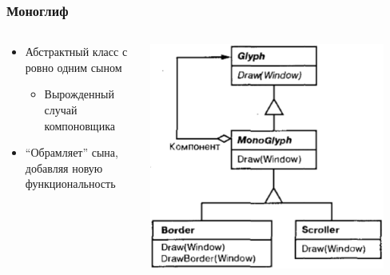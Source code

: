 \documentclass{../cscslides}
\begin{document}
    \begin{frame}
        \frametitle{Моноглиф}
        \begin{columns}
            \begin{column}{0.6\textwidth}
                \begin{itemize}
                    \item Абстрактный класс с ровно одним сыном
                    \begin{itemize}
                        \item Вырожденный случай компоновщика
                    \end{itemize}
                    \item ``Обрамляет'' сына, добавляя новую функциональность
                \end{itemize}
            \end{column}
            \begin{column}{0.4\textwidth}
                \begin{center}
                    \includegraphics[width=0.9\textwidth]{monoglyph.png}
                \end{center}
            \end{column}
        \end{columns}
    \end{frame}
\end{document}
